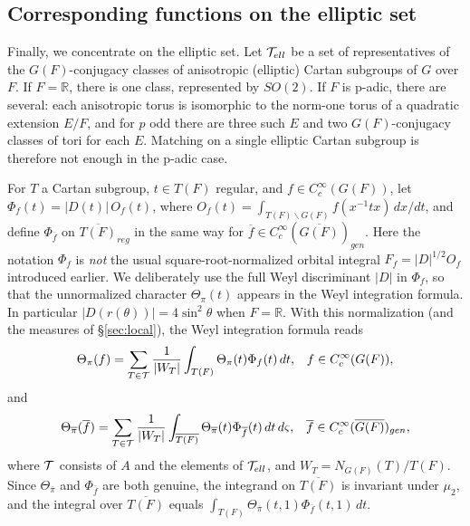 \documentclass[12pt,letterpaper,openany]{book}
\theoremstyle{plain}
\theoremstyle{definition}
\theoremstyle{remark}
\theoremstyle{remark}
\begin{document}
\subsection{Corresponding functions on the elliptic set}\label{sec:elliptic}

Finally, we concentrate on the elliptic set. Let ${\cal T}_{ell}$ be a
set of representatives of the $G(F)$-conjugacy classes of anisotropic
(elliptic) Cartan subgroups of $G$ over $F$. If $F={\mathbb R}$, there is
one class, represented by $SO(2)$. If $F$ is p-adic, there are several:
each anisotropic torus is isomorphic to the norm-one torus of a
quadratic extension $E/F$, and for $p$ odd there are three such $E$ and
two $G(F)$-conjugacy classes of tori for each $E$. Matching on a single
elliptic Cartan subgroup is therefore not enough in the p-adic case.

For $T$ a Cartan subgroup, $t\in T(F)$ regular, and
$f\in C_c^\infty(G(F))$, let $\Phi_f(t)=|D(t)|\,O_f(t)$, where
$O_f(t)=\int_{T(F)\backslash G(F)}f(x^{-1}tx)\,dx/dt$, and define
$\Phi_{\overline{f}}$ on $\overline{T(F)}_{reg}$ in the same way for
$\overline{f}\in C_c^\infty(\overline{G(F)})_{gen}$. Here the notation $\Phi_f$ is \emph{not} the usual
square-root-normalized orbital integral $F_f=|D|^{1/2}O_f$
introduced earlier. We deliberately use the full Weyl
discriminant $|D|$ in $\Phi_f$, so that the unnormalized
character $\Theta_\pi(t)$ appears in the Weyl integration formula.
In particular $|D(r(\theta))|=4\sin^2\theta$
when $F=\mathbb R$. With this
normalization (and the measures of \S\ref{sec:local}), the Weyl
integration formula reads
\[
\Theta _{\pi}(f)=\sum_{T\in{\cal T}}\frac 1{|W_T|}\int_{T(F)}\Theta _{\pi}(t)
\Phi_f(t)\,dt,\;\;\;f\in C_c^\infty (G(F)),
\]
and
\[
\Theta _{\overline{\pi } }(\overline{f})
=\sum_{T\in{\cal T}}\frac 1{|W_T|}\int_{\overline{T(F)}}
\Theta _{\overline{\pi } }(t)
\Phi_{\overline{f}}(t)\,dt\,d\varsigma,
\;\;\;\overline{f}\in C_c^\infty (\overline{G(F)})_{gen},
\]
where ${\cal T}$ consists of $A$ and the elements of ${\cal T}_{ell}$,
and $W_T=N_{G(F)}(T)/T(F)$. Since $\Theta_{\overline{\pi}}$ and
$\Phi_{\overline{f}}$ are both genuine, the integrand on
$\overline{T(F)}$ is invariant under $\mu_2$, and the integral over
$\overline{T(F)}$ equals $\int_{T(F)}\Theta_{\overline\pi}(t,1)\Phi_{\overline f}(t,1)\,dt$.
\end{document}
